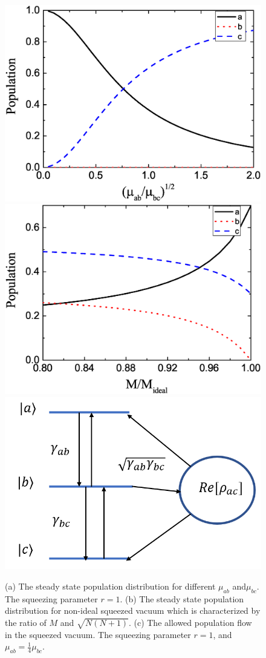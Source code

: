 \documentclass[aps,showpacs,twocolumn,twoside,groupedaddress]{revtex4}
\begin{document}
\begin{figure}
\includegraphics[width=1\columnwidth]{atom_fig4.eps}
\includegraphics[width=1\columnwidth]{atom_fig5.eps}
\includegraphics[width=1\columnwidth]{atom_fig3.png}
\caption{(a) The steady state population distribution for different $\mu_{ab}$ and$\mu_{bc}$. The squeezing parameter $r=1$. (b) The steady state population distribution for non-ideal squeezed vacuum which is characterized by the ratio of $M$ and $\sqrt{N(N+1)}$. (c) The allowed population flow in the squeezed vacuum. The squeezing parameter $r=1$, and $\mu_{ab}=\frac{1}{4}\mu_{bc}$.}
\label{2}
\end{figure}
\end{document}

